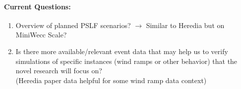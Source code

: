 \documentclass[12pt]{article}
\begin{document}
	\paragraph{Current Questions:}
	\begin{enumerate}
		
		
		\item Overview of planned PSLF scenarios? $\rightarrow$ Similar to Heredia but on MiniWecc Scale?
		
		\item Is there more available/relevant event data that may help us to verify simulations of specific instances (wind ramps or other behavior) that the novel research will focus on?\\ (Heredia paper data helpful for some wind ramp data context)
	\end{enumerate}
\end{document}
